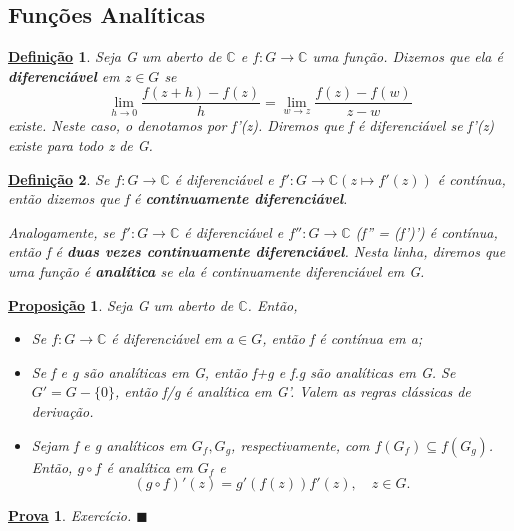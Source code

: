 \documentclass{article}
\newtheorem*{def*}{\underline{Defini\c c\~ao}}
\newtheorem*{proof*}{\underline{Prova}}
\newtheorem*{prop*}{\underline{Proposi\c c\~ao}}
\renewcommand\qedsymbol{$\blacksquare$}
\begin{document}
  \subsection{Fun\c c\~oes Anal\'iticas}
  \begin{def*}
    Seja G um aberto de $\mathbb{C}$ e $f:G\rightarrow\mathbb{C}$ uma fun\c c\~ao. Dizemos que ela \'e \textbf{diferenci\'avel}
    em $z\in{G}$ se
    $$
    \lim_{h\to{0}}\frac{f(z+h) - f(z)}{h} = \lim_{w\to{z}}\frac{f(z)-f(w)}{z-w}
    $$
    existe. Neste caso, o denotamos por f'(z). Diremos que f \'e diferenci\'avel se f'(z) existe para todo z de G.
  \end{def*}
  \begin{def*}
    Se $f:G\rightarrow\mathbb{C}$ \'e diferenci\'avel e $f':G\rightarrow\mathbb{C}(z\mapsto{f'(z)})$ \'e cont\'inua,
    ent\~ao dizemos que f \'e \textbf{continuamente diferenci\'avel}.

    Analogamente, se $f':G\rightarrow\mathbb{C}$ \'e diferenci\'avel e $f'':G\rightarrow\mathbb{C}$ (f'' = (f')') \'e
    cont\'inua, ent\~ao f \'e \textbf{duas vezes continuamente diferenci\'avel}. Nesta linha, diremos que uma fun\c c\~ao \'e
    \textbf{anal\'itica} se ela \'e continuamente diferenci\'avel em G.
  \end{def*}

  \begin{prop*}
    Seja G um aberto de $\mathbb{C}$. Ent\~ao, 
    \begin{itemize}
      \item[i)] Se $f:G\rightarrow\mathbb{C}$ \'e diferenci\'avel em $a\in{G}$, ent\~ao f \'e cont\'inua em a;
      \item[ii)] Se f e g s\~ao anal\'iticas em G, ent\~ao f+g e f.g s\~ao anal\'iticas em G. Se $G' = G - \{0\}$, 
        ent\~ao f/g \'e anal\'itica em G'. Valem as regras cl\'assicas de deriva\c c\~ao.
      \item[iii)] Sejam f e g anal\'iticos em $G_f, G_g$, respectivamente, com $f(G_f)\subseteq{f(G_g)}$. Ent\~ao, 
        $g\circ f$ \'e anal\'itica em $G_f$ e 
        $$
        (g\circ f)'(z) = g'(f(z))f'(z), \quad z\in{G}.
        $$
    \end{itemize}
  \end{prop*}
  \begin{proof*}
    Exerc\'icio.
    \qedsymbol
  \end{proof*}
\end{document}
